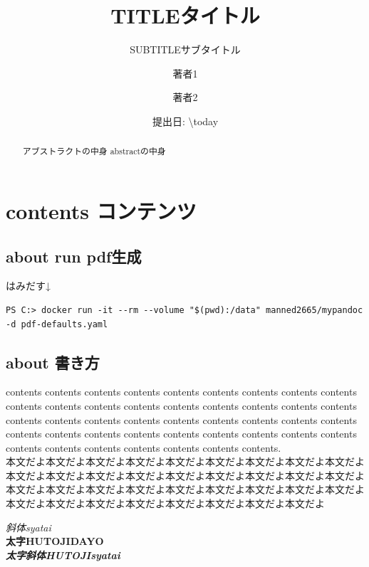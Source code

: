 \documentclass[
  10pt,
  a4paper,
  pandoc,
  titlepage]{ltjsarticle}
\title{TITLEタイトル}
\subtitle{SUBTITLEサブタイトル}
\author{著者1 \and 著者2}
\date{提出日: \textbackslash today}
\begin{document}
\maketitle
\begin{abstract}
アブストラクトの中身 abstractの中身
\end{abstract}

{
\hypersetup{linkcolor=}
\setcounter{tocdepth}{3}
\tableofcontents
}
\clearpage

\hypertarget{contents-ux30b3ux30f3ux30c6ux30f3ux30c4}{%
\section{contents
コンテンツ}\label{contents-ux30b3ux30f3ux30c6ux30f3ux30c4}}

\hypertarget{about-run-pdfux751fux6210}{%
\subsection{about run pdf生成}\label{about-run-pdfux751fux6210}}

はみだす↓

\begin{lstlisting}
PS C:> docker run -it --rm --volume "$(pwd):/data" manned2665/mypandoc -d pdf-defaults.yaml
\end{lstlisting}

\hypertarget{about-ux66f8ux304dux65b9}{%
\subsection{about 書き方}\label{about-ux66f8ux304dux65b9}}

contents contents contents contents contents contents contents contents
contents contents contents contents contents contents contents contents
contents contents contents contents contents contents contents contents
contents contents contents contents contents contents contents contents
contents contents contents contents contents contents contents contents
contents contents contents.\\
本文だよ本文だよ本文だよ本文だよ本文だよ本文だよ本文だよ本文だよ本文だよ本文だよ本文だよ本文だよ本文だよ本文だよ本文だよ本文だよ本文だよ本文だよ本文だよ本文だよ本文だよ本文だよ本文だよ本文だよ本文だよ本文だよ本文だよ本文だよ本文だよ本文だよ本文だよ本文だよ本文だよ本文だよ本文だよ

\emph{斜体syatai}\\
\textbf{太字HUTOJIDAYO}\\
\textbf{\emph{太字斜体HUTOJIsyatai}}
\end{document}
